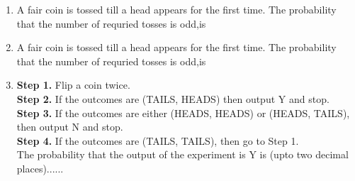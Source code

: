 \renewcommand{\theequation}{\theenumi}
\renewcommand{\thefigure}{\theenumi}
\renewcommand{\thetable}{\theenumi}
\begin{enumerate}[label=\thesection.\arabic*.,ref=\thesection.\theenumi]

\item A fair coin is tossed till a head appears for the first time. The probability that the number of requried tosses is odd,is
\begin{enumerate}
\end{enumerate}
\solution


%
\item A fair coin is tossed till a head appears for the first time. The probability that the number of requried tosses is odd,is
\begin{enumerate}
\end{enumerate}
%
\solution


%



\item \textbf{Step 1.} Flip a coin twice.\\
\textbf{Step 2.} If the outcomes are (TAILS, HEADS) then output Y and stop.\\
\textbf{Step 3.} If the outcomes are either (HEADS, HEADS) or (HEADS, TAILS), then output N and stop.\\
\textbf{Step 4.} If the outcomes are (TAILS, TAILS), then go to Step 1.\\
The probability that the output of the experiment is Y is (upto two decimal places)......
\\
%
\solution



\end{enumerate}
